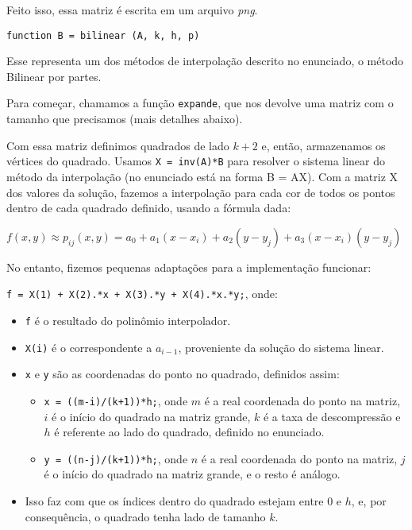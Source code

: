 \documentclass[12pt,letterpaper]{article}
\begin{document}
	Feito isso, essa matriz é escrita em um arquivo \textit{png}.

	\begin{center}
		\texttt{function B = bilinear (A, k, h, p)}
	\end{center}
	
	Esse representa um dos métodos de interpolação descrito no enunciado, o método Bilinear por partes.
	
	Para começar, chamamos a função \texttt{expande}, que nos devolve uma matriz com o tamanho que precisamos (mais detalhes abaixo).
	
	Com essa matriz definimos quadrados de lado $k+2$ e, então, armazenamos os vértices do quadrado. Usamos \texttt{X = inv(A)*B} para resolver o sistema linear do método da interpolação (no enunciado está na forma B = AX). Com a matriz X dos valores da solução, fazemos a interpolação para cada cor de todos os pontos dentro de cada quadrado definido, usando a fórmula dada:
	
	\begin{center}
		$f(x, y) \approx p_{ij} (x, y) = a_0 + a_1(x - x_i ) + a_2 (y - y_j ) + a_3 (x - x_i )(y - y_j)$
	\end{center}
	
	No entanto, fizemos pequenas adaptações para a implementação funcionar:
	
	\begin{center}
		\texttt{f = X(1) + X(2).*x + X(3).*y + X(4).*x.*y;}, onde:
	\end{center}
	
	\begin{itemize}
		\item \texttt{f} é o resultado do polinômio interpolador.
		\item \texttt{X(i)} é o correspondente a $a_{i-1}$, proveniente da solução do sistema linear.
		\item \texttt{x} e \texttt{y} são as coordenadas do ponto no quadrado, definidos assim:
		\begin{itemize}
			\item \texttt{x = ((m-i)/(k+1))*h;}, onde $m$ é a real coordenada do ponto na matriz, $i$ é o início do quadrado na matriz grande, $k$ é a taxa de descompressão e $h$ é referente ao lado do quadrado, definido no enunciado.
			\item \texttt{y = ((n-j)/(k+1))*h;}, onde $n$ é a real coordenada do ponto na matriz, $j$ é o início do quadrado na matriz grande, e o resto é análogo.
		\end{itemize}
		\item Isso faz com que os índices dentro do quadrado estejam entre 0 e $h$, e, por consequência, o quadrado tenha lado de tamanho $k$.
	\end{itemize}
	
\end{document}
